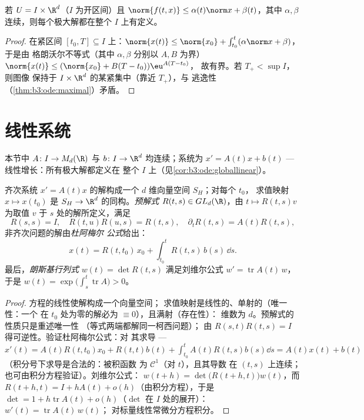 \begin{corollary}[线性增长下的整体存在性]
\label{cor:b3:ode:globallinear}
若 $U = I\times\R^d$（$I$ 为开区间）且 $\norm{f(t, x)}
\leq \alpha(t)\norm x + \beta(t)$，其中 $\alpha, \beta$
连续，则每个极大解都在整个
$I$ 上有定义。
\end{corollary}

\begin{proof}
在紧区间 $[t_0, T] \subseteq I$ 上：$\norm{x(t)} \leq
\norm{x_0} + \int_{t_0}^t(\alpha\norm x + \beta)$，于是由
格朗沃尔不等式（其中 $\alpha, \beta$ 分别以 $A, B$ 为界）
$\norm{x(t)} \leq (\norm{x_0} + B(T - t_0))\eu^{A(T - t_0)}$，
故有界。若 $T_+ < \sup I$，则图像
保持于 $I\times\R^d$ 的某紧集中（靠近 $T_+$），与
逃逸性（\cref{thm:b3:ode:maximal}）矛盾。
\end{proof}

\section{线性系统}

本节中 $A \colon I \to M_d(\R)$ 与 $b
\colon I \to \R^d$ 均连续；系统为 $x' = A(t)x
+ b(t)$ --- 线性增长：所有极大解都定义在
整个 $I$ 上（见\cref{cor:b3:ode:globallinear}）。

\begin{theorem}[结构]\label{thm:b3:ode:linearstructure}
齐次系统 $x' = A(t)x$ 的解构成一个
$d$ 维向量空间 $S_H$；对每个 $t_0$，
求值映射 $x \mapsto x(t_0)$ 是 $S_H \to
\R^d$ 的同构。\emph{预解式} $R(t, s) \in GL_d(\R)$，由 $t \mapsto R(t,
s)v$ 为取值 $v$ 于 $s$ 处的解所定义，满足
\[
R(s,s) = I,\quad R(t, u)R(u, s) = R(t, s),\quad
\partial_tR(t,s) = A(t)R(t,s),
\]
非齐次问题的解由\emph{杜阿梅尔
公式}给出：
\[
x(t) = R(t, t_0)\,x_0 + \int_{t_0}^{t}R(t, s)\,b(s)\,\dd s .
\]
最后，\emph{朗斯基行列式} $w(t) = \det
R(t, s)$ 满足刘维尔公式 $w' =
\operatorname{tr}A(t)\,w$，于是 $w(t) =
\exp\bigl(\int_s^t\operatorname{tr}A\bigr) > 0$。
\end{theorem}

\begin{proof}
方程的线性使解构成一个向量空间；
求值映射是线性的、单射的（唯一性：一个
在 $t_0$ 处为零的解必为 $\equiv 0$），且满射（存在性）：
维数为 $d$。预解式的性质只是重述唯一性
（等式两端都解同一柯西问题）；
由 $R(s,t)R(t,s) = I$ 得可逆性。验证杜阿梅尔公式：对
其求导 --- $x'(t) = A(t)R(t,t_0)x_0 + R(t,t)b(t) +
\int_{t_0}^tA(t)R(t,s)b(s)\dd s = A(t)x(t) + b(t)$
（积分号下求导是合法的：被积函数
为 $\mathcal C^1$（对 $t$），且其导数
在 $(t,s)$ 上连续；也可由积分方程验证）。刘维尔公式：
$w(t + h) = \det\bigl(R(t+h, t)\bigr)w(t)$，而 $R(t + h, t) =
I + hA(t) + o(h)$（由积分方程），于是 $\det = 1
+ h\operatorname{tr}A(t) + o(h)$（$\det$ 在
$I$ 处的展开）：$w'(t) = \operatorname{tr}A(t)\,w(t)$；
对标量线性常微分方程积分。
\end{proof}

